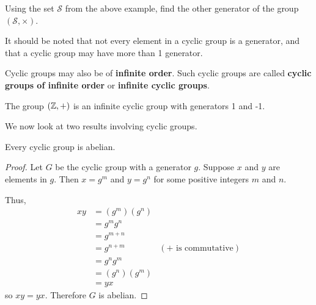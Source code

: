 \begin{exercise}
    Using the set $\mathcal{S}$ from the above example, find the other generator of the group $(\mathcal{S}, \times)$.
\end{exercise}

It should be noted that not every element in a cyclic group is a generator, and that a cyclic group may have more than 1 generator.

Cyclic groups may also be of \textbf{infinite order}. Such cyclic groups are called \textbf{cyclic groups of infinite order} or \textbf{infinite cyclic groups}.
\begin{example}
    The group $(\mathbb{Z}, +)$ is an infinite cyclic group with generators 1 and -1.
\end{example}

We now look at two results involving cyclic groups.
\begin{proposition}\label{prop-cyclic-group-is-abelian}
    Every cyclic group is abelian.
\end{proposition}
\begin{proof}
    Let $G$ be the cyclic group with a generator $g$. Suppose $x$ and $y$ are elements in $g$. Then $x = g^m$ and $y = g^n$ for some positive integers $m$ and $n$.

    Thus,
    \begin{align*}
        xy &= (g^m)(g^n)\\
        &= g^mg^n\\
        &= g^{m+n}\\
        &= g^{n+m} & (\text{+ is commutative})\\
        &= g^ng^m\\
        &= (g^n)(g^m)\\
        &= yx
    \end{align*}
    so $xy = yx$. Therefore $G$ is abelian.
\end{proof}

